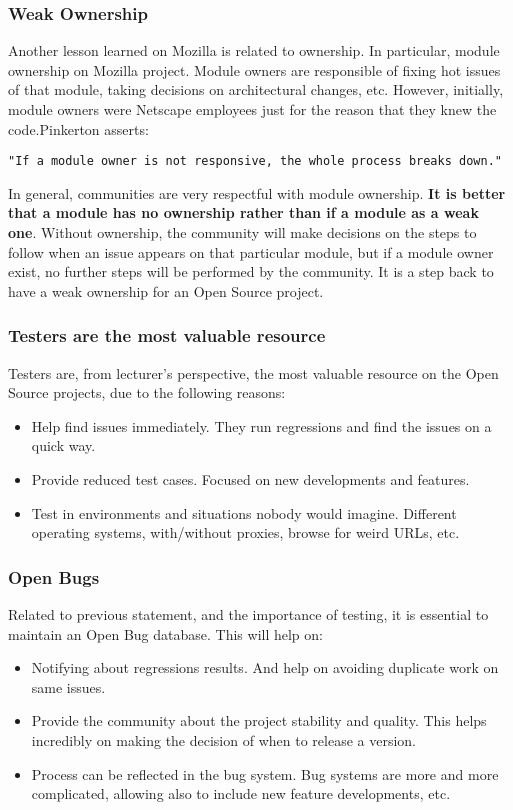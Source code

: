 \documentclass[11pt]{article}
\begin{document}
\subsubsection{Weak Ownership}
Another lesson learned on Mozilla is related to ownership. In particular, module ownership on Mozilla project. Module owners are responsible of fixing hot issues of that module, taking decisions on architectural changes, etc. However, initially, module owners were Netscape employees just for the reason that they knew the code.Pinkerton asserts:
\begin{verbatim}
"If a module owner is not responsive, the whole process breaks down."
\end{verbatim}
In general, communities are very respectful with module ownership. \textbf{It is better that a module has no ownership rather than if a module as a weak one}. Without ownership, the community will make decisions on the steps to follow when an issue appears on that particular module, but if a module owner exist, no further steps will be performed by the community. It is a step back to have a weak ownership for an Open Source project.

\subsubsection{Testers are the most valuable resource}
Testers are, from lecturer's perspective, the most valuable resource on the Open Source projects, due to the following reasons:
\begin{itemize}\itemsep0pt
\item{Help find issues immediately}. They run regressions and find the issues on a quick way.
\item{Provide reduced test cases}. Focused on new developments and features.
\item{Test in environments and situations nobody would imagine}. Different operating systems, with/without proxies, browse for weird URLs, etc.
\end{itemize}

\subsubsection{Open Bugs}
Related to previous statement, and the importance of testing, it is essential to maintain an Open Bug database. This will help on:
\begin{itemize}\itemsep0pt
\item{Notifying about regressions results}. And help on avoiding duplicate work on same issues.
\item{Provide the community about the project stability and quality}. This helps incredibly on making the decision of when to release a version.
\item{Process can be reflected in the bug system}. Bug systems are more and more complicated, allowing also to include new feature developments, etc.
\end{itemize}
\end{document}

